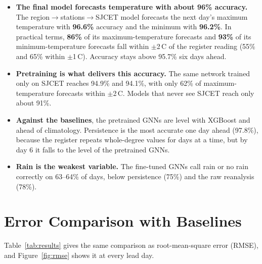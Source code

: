 \begin{itemize}
    \item \textbf{The final model forecasts temperature with about 96\% accuracy.} The region$\to$\allowbreak{}stations$\to$\allowbreak{}SJCET model forecasts the next day's maximum temperature with \textbf{96.6\%} accuracy and the minimum with \textbf{96.2\%}. In practical terms, \textbf{86\%} of its maximum-temperature forecasts and \textbf{93\%} of its minimum-temperature forecasts fall within $\pm$2\,\textdegree C of the register reading (55\% and 65\% within $\pm$1\,\textdegree C). Accuracy stays above 95.7\% six days ahead.
    \item \textbf{Pretraining is what delivers this accuracy.} The same network trained only on SJCET reaches 94.9\% and 94.1\%, with only 62\% of maximum-temperature forecasts within $\pm$2\,\textdegree C. Models that never see SJCET reach only about 91\%.
    \item \textbf{Against the baselines}, the pretrained GNNs are level with XGBoost and ahead of climatology. Persistence is the most accurate one day ahead (97.8\%), because the register repeats whole-degree values for days at a time, but by day 6 it falls to the level of the pretrained GNNs.
    \item \textbf{Rain is the weakest variable.} The fine-tuned GNNs call rain or no rain correctly on 63--64\% of days, below persistence (75\%) and the raw reanalysis (78\%).
\end{itemize}

\section{Error Comparison with Baselines}
\label{sec:res-full}

Table~\ref{tab:results} gives the same comparison as root-mean-square error (RMSE), and Figure~\ref{fig:rmse} shows it at every lead day.

